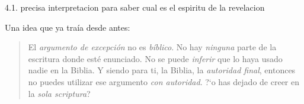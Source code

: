 \documentclass{article}
\begin{document}
4.1. precisa interpretacion para saber cual es el espiritu de la revelacion

Una idea que ya tra\'ia desde antes:
\begin{quote}
El \emph{argumento de excepci\'on} no es \emph{b\'{i}blico}. No hay \emph{ninguna} parte de la escritura donde est\'e enunciado. No se puede \emph{inferir} que lo haya usado nadie en la Biblia. Y siendo para ti, la Biblia, la \emph{autoridad final}, entonces no puedes utilizar ese argumento \emph{con autoridad}. ?`o has dejado de creer en la \emph{sola scriptura}?
\end{quote}








\end{document}
